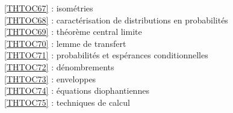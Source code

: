 \ref {THTOC67} : isométries\\
\ref {THTOC68} : caractérisation de distributions en probabilités\\
\ref {THTOC69} : théorème central limite\\
\ref {THTOC70} : lemme de transfert\\
\ref {THTOC71} : probabilités et espérances conditionnelles\\
\ref {THTOC72} : dénombrements\\
\ref {THTOC73} : enveloppes\\
\ref {THTOC74} : équations diophantiennes\\
\ref {THTOC75} : techniques de calcul\\
